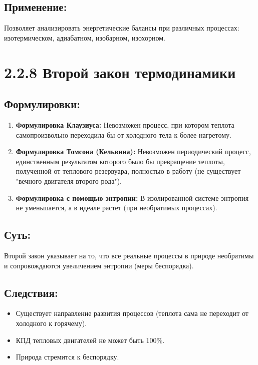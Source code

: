 \documentclass[a4paper,12pt]{article}
\begin{document}
\vspace{-9pt}
\subsection*{Применение:}
\vspace{-3pt}
Позволяет анализировать энергетические балансы при различных процессах: изотермическом, адиабатном, изобарном, изохорном.



\section*{2.2.8 Второй закон термодинамики}
\vspace{-9pt}
\subsection*{Формулировки:}
\vspace{-3pt}
\begin{enumerate}[itemsep=0pt, topsep=0pt, parsep=3pt]
    \item \textbf{Формулировка Клаузиуса:} Невозможен процесс, при котором теплота самопроизвольно переходила бы от холодного тела к более нагретому.
    \item \textbf{Формулировка Томсона (Кельвина):} Невозможен периодический процесс, единственным результатом которого было бы превращение теплоты, полученной от теплового резервуара, полностью в работу (не существует "вечного двигателя второго рода").
    \item \textbf{Формулировка с помощью энтропии:} В изолированной системе энтропия не уменьшается, а в идеале растет (при необратимых процессах).
\end{enumerate}

\vspace{-9pt}
\subsection*{Суть:}
\vspace{-3pt}
Второй закон указывает на то, что все реальные процессы в природе необратимы и сопровождаются увеличением энтропии (меры беспорядка).
\newpage
\vspace{-9pt}
\subsection*{Следствия:}
\vspace{-3pt}
\begin{itemize}
    \item Существует направление развития процессов (теплота сама не переходит от холодного к горячему).
    \item КПД тепловых двигателей не может быть 100\%.
    \item Природа стремится к беспорядку.
\end{itemize}
\end{document}

